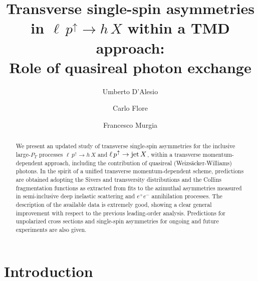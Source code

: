 \documentclass[nofootinbib,superscriptaddress,aps]{revtex4}
\begin{document}
\title{Transverse single-spin asymmetries in $\ell \,p^\uparrow\to h \,X$  within a TMD approach:\\
Role of quasireal photon exchange}

\author{Umberto D'Alesio}

\author{Carlo Flore}

\author{Francesco Murgia}



\begin{abstract}
We present an updated study of transverse single-spin asymmetries for the inclusive large-$P_T$ processes $\ell \, p^\uparrow \to h\, X$ and $\ell\, p^\uparrow \to {\rm jet}\,X$, within a transverse momentum-dependent approach, including the contribution of quasireal (Weizs\"acker-Williams) photons. In the spirit of a unified transverse momentum-dependent scheme, predictions are obtained adopting the Sivers and transversity distributions and the Collins fragmentation functions as extracted from fits to the azimuthal asymmetries measured in semi-inclusive deep inelastic scattering and $e^+e^-$ annihilation processes. The description of the available data is extremely good, showing a clear general improvement with respect to the previous leading-order analysis. Predictions for unpolarized cross sections and single-spin asymmetries for  ongoing and future experiments are also given.
\end{abstract}


\maketitle


\section{Introduction}
\label{intro}
\end{document}
